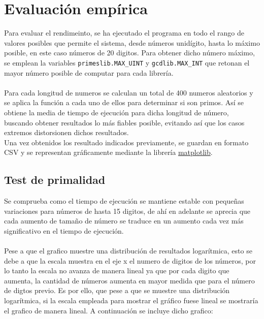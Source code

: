 \section{Evaluación empírica}

Para evaluar el rendimeinto, se ha ejecutado el programa en todo el rango de valores posibles que permite el sistema, desde números unidígito, hasta lo máximo posible, en este caso números de 20 digitos. Para obtener dicho número máximo, se emplean la variables \texttt{primeslib.MAX\_UINT} y \texttt{gcdlib.MAX\_INT} que retonan el mayor número posible de computar para cada librería.\\
\\
Para cada longitud de numeros se calculan un total de 400 numeros aleatorios y se aplica la función a cada uno de ellos para determinar si son primos. Así se obtiene la media de tiempo de ejecución para dicha longitud de número, buscando obtener resultados lo más fiables posible, evitando así que los casos extremos distorsionen dichos resultados.\\

Una vez obtenidos los resultado indicados previamente, se guardan en formato CSV y se representan gráficamente mediante la librería \href{https://matplotlib.org/}{matplotlib}.

\subsection{Test de primalidad}
Se comprueba como el tiempo de ejecución se mantiene estable con pequeñas variaciones para números de hasta 15 digitos, de ahí en adelante se aprecia que cada aumento de tamaño de número se traduce en un aumento cada vez más significativo en el tiempo de ejecución.\\
\\
Pese a que el grafico muestre una distribución de resultados logarítmica, esto se debe a que la escala muestra en el eje x el numero de digitos de los números, por lo tanto la escala no avanza de manera lineal ya que por cada digito que aumenta, la cantidad de números aumenta en mayor medida que para el número de digtos previo. Es por ello, que pese a que se muestre una distribución logarítmica, si la escala empleada para mostrar el gráfico fuese lineal se mostraría el grafico de manera lineal. A continuación se incluye dicho grafico:

